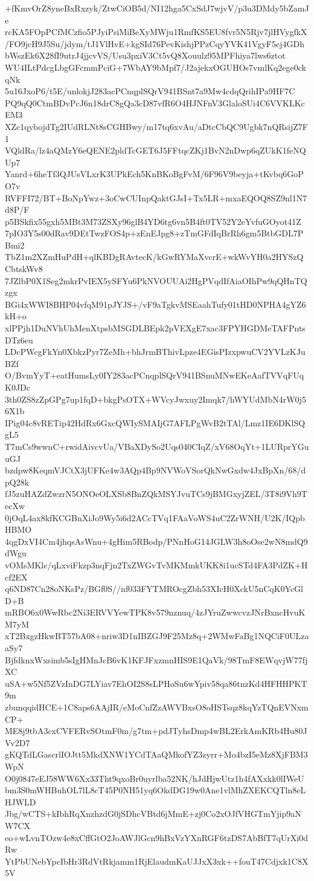 +fKmvOrZ8yneBxRxzyk/ZtwCiOB5d/NI12hga5CxSdJ7wjvV/p3u3DMdy5bZamJe
rcKA5FOpPCfMCzfio5PJyiPsiMiBeXyMWju1RmfKS5EU8fvr5N5Rjv7jlHVygfkX
/FO9jcH9J5Su/jdym/tJ1VlHvE+kgSId76PevKishjPPzCqyYVK41VgyF5cj4GDh
bWszEk6X28fI9utrJ4jjcvVS/Usu3pxiV3Ct5vQ8Xouulz95MPFhiya7lws6ztot
WU4ILtPdcgLbgGFcmmPciG+7WbAY9bMpf7/J2ajekxOGUHOs7vmlKq2ege0ckqNk
5u16JxoP6/t5E/unlokjJ283acPCnqplSQrV941BSnt7a9Mw4cdqQrihIPa9HF7C
PQ9qQ0CtmBDvPcJ6n18drC8gQa3cD87vfR6O4HJNFnV3GlaloSUi4C6VVKLKcEM3
XZc1qybojdTg2IUdRLNt8sCGHBwy/m17tq6xvAu/aDtcCbQC9Ugbk7nQRsijZ7F1
VQldRa/lz4aQMzY6eQENE2pldTcGET6J5FFtqcZKj1BvN2nDwp6qZUkK1feNQUp7
Yanrd+6heTf3QJUsVLxrK3UPkEch5KnBKoBgFvM/6F96V9beyja+tKvbq6GoPO7v
RVFFI72/BT+BoNpYwz+3oCwCUInpQaktGJsI+Tx5LR+mxaEQOQ8SZ9nl1N7d8P/F
p5BSkfix55gxh5MBt3M73ZSXy96glB4YD6tg6vn5B4ft0TV52Y2eYvfuGOyot41Z
7pIO3Y5s00dRav9DEtTwzFOS4p+zEnEJpg8+zTmGFdIqBrRh6gm5BtbGDL7PBmi2
TbZ1m2XZmHuPdH+qlKBDgRAvtecK/kGwRYMaXvcrE+wkWvYH0a2HYSzQCbtskWv8
7JZlbP0X1Seg2mkrPvIEX5ySFYu6PkNVOUUAi2HgPVqdIfAiaOIhPw9qQHnTQzgx
BGi4xWWI8BHP04vfqM91pJYJS+/vF9aTgkvMSEaahTufy01tHD0NPHA4gYZ6kH+o
xlPPjh1DuNVhUhMenXtpsbMSGDLBEpk2pVEXgE7xac3FPYHGDMeTAFPntsDTz6eu
LDcPWcgFkYn0XbkzPyr7ZeMh+bhJrmBThivLpze4EGisPIzxpwuCV2YVLzKJuBZf
O/BvmYyT+eatHumsLy0IY283acPCnqplSQrV941BSnuMNwEKeAafTVVqFUqK0JDc
3th0ZS8zZpGPg7up1fqD+bkgPsOTX+WVcyJwxuy2Imqk7/hWYUdMbN4rW0j56X1b
IPig04c8vRETip42HdRx6GxcQWIySMAIjG7AFLPgWvB2tTAl/Lmz1IE6DKlSQgL5
T7mCs9wwnC+rwidAivcvUa/VBaXDySo2Uqs040CIqZ/xV68OqYt+1LURprYGuuGJ
bzdpw8KeqmVJCtX3jUFKe4w3AQp4Bp9NVWoVSorQkNwGxdw4JxBpXn/68/dpQ28k
fJ5zuHAZdZwzrN5ONOeOLXSb8BnZQkMSYJvuTCs9jBMGxyjZEL/3T8i9Vh9TecXw
0jOqL4ax8kfKCGBnXiJo9Wy5i6d2ACcTVq1FAaVoWS4uC2ZrWNH/U2K/IQpbHBMO
4qgDxVI4Cm4jhqsAsWnu+4gHim5RBodp/PNnHoG14JGLW3h8oOse2wN8mdQ9dWgu
vOMsMKlc/qLxviFkzp3nqFjn2TxZWGvTvMKMmkUKK8i1ucSTd4FA3PdZK+Hcf2EX
q6ND87Cn28oNKsPz/BGf0S//nf033FYTMROcgZbh53XIcH0XckU5nCqK0YcGlD+B
mRBO6x0WwRbc2Ni3ERVVYewTPK8v579nznuq/4zJYruZwwcvzJNrBxncHvuKM7yM
xT2BxgzHkwBT57bA08+nriw3D1nIBZGJ9F25Mz8q+2WMwFaBg1NQCiF0ULzaaSy7
BjfdknxWxsimb5sIgHMnJcB6vK1KFJFxzmnHIS9E1QaVk/98TmF8EWqvjW77fjXC
uSA+w5Nf5ZVzInDG7LYiav7EhOI2S8sLPHoSu6wYpiv58qa86tnzKd4HFHHPKT9m
zbunqqidHCE+1C8aps6AAjIR/eMoCnfZzAWVBxsO8oHSTsqz8kqYzTQnEVNxmCP+
ME8j9tbA3cxCVFERvSOtmF0m/g7tm+pdJTyhsDmp4wBL2ErkAmKRb4Hu80JVv2D7
gKQTdLGascrlIOJtt5MkdXNW1YCdTAaQMkofYZ3zyrr+Mo4bzI5eMz8XjFBM3WpN
O0j0847eEJ58WW6Xx33Tht9qxoBr0uyrlba52NK/hJdHjwUtz1h4fAXxkk0lIWeU
bm3S0mWHBuhOL7lL8cT45P0NH51yq6OkdDG19w0Ane1vlMhZXEKCQTln8eLHJWLD
Jbg/wCTS+kIbhRqXnzhzdG0jSDhcVBtd6jMmE+zj0Co2xOJfVHGTmYjip9aNW7CX
eo+wLvnTOzw4e8xCffGtO2JoAWJlGcn9hBxVzYXnRGF6tzDS7AbBfT7qUrXi0dRw
YtPbUNebYpcIbHr3RdVtRkjamm1RjElaudmKaUJJxX3xk++fouT47Cdjxk1C8X5V
